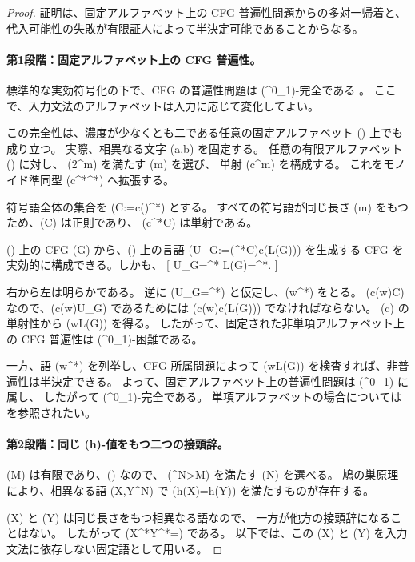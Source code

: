 \documentclass[11pt,a4paper]{ltjsarticle}
\theoremstyle{remark}
\begin{document}
\begin{proof}
証明は、固定アルファベット上の CFG 普遍性問題からの多対一帰着と、
代入可能性の失敗が有限証人によって半決定可能であることからなる。

\paragraph{第1段階：固定アルファベット上の CFG 普遍性。}
標準的な実効符号化の下で、CFG の普遍性問題は
(\Pi^0_1)-完全である
\cite{DomaratzkiOkhotinShallit2007}。
ここで、入力文法のアルファベットは入力に応じて変化してよい。

この完全性は、濃度が少なくとも二である任意の固定アルファベット
(\Sigma) 上でも成り立つ。
実際、相異なる文字 (a,b\in\Sigma) を固定する。
任意の有限アルファベット (\Gamma) に対し、
(2^m\ge\lvert\Gamma\rvert) を満たす (m) を選び、
単射 (c\colon\Gamma{}^m) を構成する。
これをモノイド準同型 (c\colon\Gamma^*\to\Sigma^*) へ拡張する。

符号語全体の集合を (C:=c(\Gamma)^*) とする。
すべての符号語が同じ長さ (m) をもつため、(C) は正則であり、
(c\colon\Gamma^*\to C) は単射である。

(\Gamma) 上の CFG (G) から、(\Sigma) 上の言語
(U_G:=(\Sigma^*\setminus C)\cup c(L(G))) を生成する CFG を
実効的に構成できる。しかも、
[
U_G=\Sigma^*
\quad\Longleftrightarrow\quad
L(G)=\Gamma^*.
]

右から左は明らかである。
逆に (U_G=\Sigma^*) と仮定し、(w\in\Gamma^*) をとる。
(c(w)\in C) なので、(c(w)\in U_G) であるためには
(c(w)\in c(L(G))) でなければならない。
(c) の単射性から (w\in L(G)) を得る。
したがって、固定された非単項アルファベット上の CFG 普遍性は
(\Pi^0_1)-困難である。

一方、語 (w\in\Sigma^*) を列挙し、CFG 所属問題によって
(w\notin L(G)) を検査すれば、非普遍性は半決定できる。
よって、固定アルファベット上の普遍性問題は (\Pi^0_1) に属し、
したがって (\Pi^0_1)-完全である。
単項アルファベットの場合については
\cite{Hopcroft1969} を参照されたい。

\paragraph{第2段階：同じ (h)-値をもつ二つの接頭辞。}
(M) は有限であり、(\lvert\Sigma\rvert{}) なので、
(\lvert\Sigma\rvert^N>\lvert M\rvert) を満たす (N) を選べる。
鳩の巣原理により、相異なる語 (X,Y\in\Sigma^N) で
(h(X)=h(Y)) を満たすものが存在する。

(X) と (Y) は同じ長さをもつ相異なる語なので、
一方が他方の接頭辞になることはない。
したがって (X\Sigma^*\cap Y\Sigma^*=\emptyset) である。
以下では、この (X) と (Y) を入力文法に依存しない固定語として用いる。


\end{proof}
\end{document}
